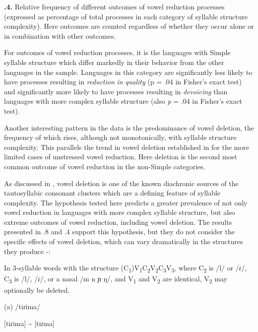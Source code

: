 \textbf{.4.} Relative frequency of different outcomes of vowel reduction processes (expressed as percentage of total processes in each category of syllable structure complexity). Here outcomes are counted regardless of whether they occur alone or in combination with other outcomes.

  For outcomes of vowel reduction processes, it is the languages with Simple syllable structure which differ markedly in their behavior from the other languages in the sample. Languages in this category are significantly less likely to have processes resulting in \textit{reduction} \textit{in} \textit{quality} (p = .04 in Fisher’s exact test) and significantly more likely to have processes resulting in \textit{devoicing} than languages with more complex syllable structure (also \textit{p} = .04 in Fisher’s exact test).

  Another interesting pattern in the data is the predominance of vowel deletion, the frequency of which rises, although not monotonically, with syllable structure complexity. This parallels the trend in vowel deletion established in  for the more limited cases of unstressed vowel reduction. Here deletion is the second most common outcome of vowel reduction in the non-Simple categories. 

  As discussed in , vowel deletion is one of the known diachronic sources of the tautosyllabic consonant clusters which are a defining feature of syllable complexity. The hypothesis tested here predicts a greater prevalence of not only vowel reduction in languages with more complex syllable structure, but also extreme outcomes of vowel reduction, including vowel deletion. The results presented in .8 and .4 support this hypothesis, but they do not consider the specific effects of vowel deletion, which can vary dramatically in the structures they produce -:

\ea\label{ex:(6.14)}

  In 3-syllable words with the structure (C\textsubscript{1})V\textsubscript{1}C\textsubscript{2}V\textsubscript{2}C\textsubscript{3}V\textsubscript{3}, where C\textsubscript{2} is /l/ or /ɾ/, C\textsubscript{3} is /l/, /ɾ/, or a nasal /m n ɲ ŋ/, and V\textsubscript{1} and V\textsubscript{2} are identical, V\textsubscript{2} may optionally be deleted.

(a)  /tiɾima/

[tiɾima] {\textasciitilde} [tiɾma]

